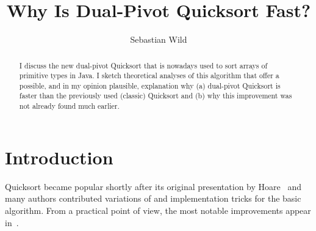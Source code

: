 \documentclass[]{theotage}
\begin{document}
\title{Why Is Dual-Pivot Quicksort Fast?}
\author[a]{Sebastian Wild}

\address[a]{Fachbereich Informatik, TU Kaiserslautern\\
  }

\maketitle

\begin{abstract}
	I discuss the new dual-pivot Quicksort that is nowadays 
	used to sort arrays of primitive types in Java.
	I sketch theoretical analyses of this algorithm that offer a possible, 
	and in my opinion plausible, explanation why 
	(a) dual-pivot Quicksort is faster than the previously used (classic) Quicksort and 
	(b) why this improvement was not already found much earlier. 
\end{abstract}

\section{Introduction}
Quicksort became popular shortly after its original presentation by Hoare~\cite{Hoare1962} and
many authors contributed variations of and implementation tricks for the basic algorithm.
From a practical point of view, the most notable improvements appear 
in~\cite{Singleton1969,Sedgewick1975,Bentley1993,Musser1997}.\strut
\end{document}
